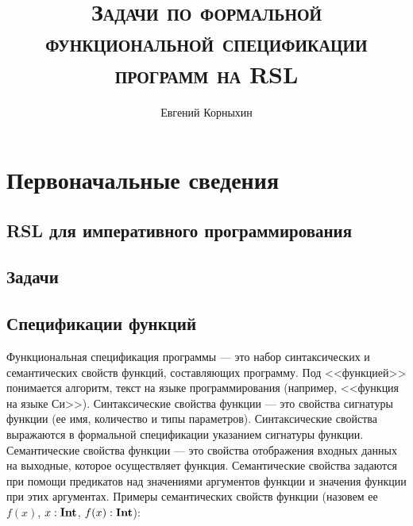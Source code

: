 \documentclass[14pt, twoside]{extreport}
\author{Евгений Корныхин}
\title{\huge{\textbf{\textsc{Задачи по формальной функциональной спецификации программ на RSL}}}}
\newcounter{problem_type}[chapter]
\begin{document}
\maketitle

\tableofcontents




\chapter{Первоначальные сведения}

\section{RSL для императивного программирования}



\section*{Задачи}



\section{Спецификации функций}

Функциональная спецификация программы --- это набор синтаксических и семантических свойств функций, составляющих программу. Под <<функцией>> понимается алгоритм, текст на языке программирования (например, <<функция на языке Си>>). Синтаксические свойства функции --- это свойства сигнатуры функции (ее имя, количество и типы параметров). Синтаксические свойства выражаются в формальной спецификации указанием сигнатуры функции. Семантические свойства функции --- это свойства отображения входных данных на выходные, которое осуществляет функция. Семантические свойства задаются при помощи предикатов над значениями аргументов функции и значения функции при этих аргументах. Примеры семантических свойств функции (назовем ее $f(x)$, $x: \textbf{Int}$, $f(x) : \textbf{Int}$):
\end{document}
